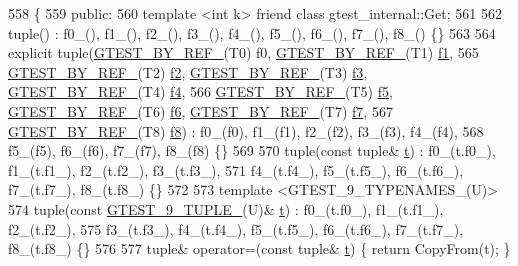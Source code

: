 \begin{DoxyCode}
558                         \{
559  \textcolor{keyword}{public}:
560   \textcolor{keyword}{template} <\textcolor{keywordtype}{int} k> \textcolor{keyword}{friend} \textcolor{keyword}{class }gtest\_internal::Get;
561 
562   tuple() : f0\_(), f1\_(), f2\_(), f3\_(), f4\_(), f5\_(), f6\_(), f7\_(), f8\_() \{\}
563 
564   \textcolor{keyword}{explicit} tuple(\hyperlink{gtest-tuple_8h_adcf9057737a411d833fac0382c13a181}{GTEST\_BY\_REF\_}(T0) f0, \hyperlink{gtest-tuple_8h_adcf9057737a411d833fac0382c13a181}{GTEST\_BY\_REF\_}(T1) 
      \hyperlink{namespacestd_1_1tr1_a9c0fa65b105f8e2f58ba59ecf75fd000}{f1},
565       \hyperlink{gtest-tuple_8h_adcf9057737a411d833fac0382c13a181}{GTEST\_BY\_REF\_}(T2) \hyperlink{namespacestd_1_1tr1_a87dd9e009868361317f587126dba63d4}{f2}, \hyperlink{gtest-tuple_8h_adcf9057737a411d833fac0382c13a181}{GTEST\_BY\_REF\_}(T3) \hyperlink{namespacestd_1_1tr1_a0f7c3b47d27d42d82d1a333ea420ce4e}{f3}, 
      \hyperlink{gtest-tuple_8h_adcf9057737a411d833fac0382c13a181}{GTEST\_BY\_REF\_}(T4) \hyperlink{namespacestd_1_1tr1_adc796e02b7385d526aff708189564f67}{f4},
566       \hyperlink{gtest-tuple_8h_adcf9057737a411d833fac0382c13a181}{GTEST\_BY\_REF\_}(T5) \hyperlink{namespacestd_1_1tr1_a9c1eb66b2b2fa321942af95405232a0d}{f5}, \hyperlink{gtest-tuple_8h_adcf9057737a411d833fac0382c13a181}{GTEST\_BY\_REF\_}(T6) \hyperlink{namespacestd_1_1tr1_a6b62f32e1e3e21bceb94eb46c4cbfd56}{f6}, 
      \hyperlink{gtest-tuple_8h_adcf9057737a411d833fac0382c13a181}{GTEST\_BY\_REF\_}(T7) \hyperlink{namespacestd_1_1tr1_a2185f3a1c07f2df072c39cb91ffa89a4}{f7},
567       \hyperlink{gtest-tuple_8h_adcf9057737a411d833fac0382c13a181}{GTEST\_BY\_REF\_}(T8) \hyperlink{namespacestd_1_1tr1_ab998afa41cea8d6d26d7e4288b0bf974}{f8}) : f0\_(f0), f1\_(f1), f2\_(f2), f3\_(f3), f4\_(f4),
568       f5\_(f5), f6\_(f6), f7\_(f7), f8\_(f8) \{\}
569 
570   tuple(\textcolor{keyword}{const} tuple& \hyperlink{namespacebattery__monitor__node_a7a63d20d1ea461e280f4eb5b47f925cd}{t}) : f0\_(t.f0\_), f1\_(t.f1\_), f2\_(t.f2\_), f3\_(t.f3\_),
571       f4\_(t.f4\_), f5\_(t.f5\_), f6\_(t.f6\_), f7\_(t.f7\_), f8\_(t.f8\_) \{\}
572 
573   \textcolor{keyword}{template} <GTEST\_9\_TYPENAMES\_(U)>
574   tuple(\textcolor{keyword}{const} \hyperlink{gtest-tuple_8h_a1a81c17bfe3cdceb4d56b15985a44a7e}{GTEST\_9\_TUPLE\_}(U)& \hyperlink{namespacebattery__monitor__node_a7a63d20d1ea461e280f4eb5b47f925cd}{t}) : f0\_(t.f0\_), f1\_(t.f1\_), f2\_(t.f2\_),
575       f3\_(t.f3\_), f4\_(t.f4\_), f5\_(t.f5\_), f6\_(t.f6\_), f7\_(t.f7\_), f8\_(t.f8\_) \{\}
576 
577   tuple& operator=(\textcolor{keyword}{const} tuple& \hyperlink{namespacebattery__monitor__node_a7a63d20d1ea461e280f4eb5b47f925cd}{t}) \{ \textcolor{keywordflow}{return} CopyFrom(t); \}

\end{DoxyCode}
